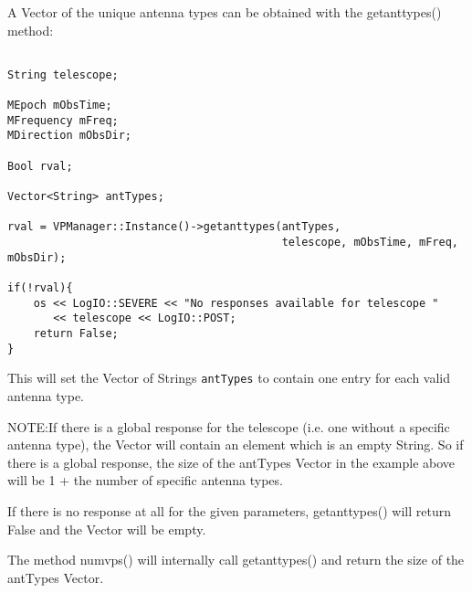\documentclass[12pt]{article}
\begin{document}
\newpage

A Vector of the unique antenna types can be obtained with the getanttypes() method:
{\small
\begin{verbatim}

String telescope; 

MEpoch mObsTime;
MFrequency mFreq;
MDirection mObsDir;

Bool rval;

Vector<String> antTypes;

rval = VPManager::Instance()->getanttypes(antTypes, 
                                          telescope, mObsTime, mFreq, mObsDir);

if(!rval){
    os << LogIO::SEVERE << "No responses available for telescope "
       << telescope << LogIO::POST;
    return False;
}

\end{verbatim}
}
This will set the Vector of Strings {\tt antTypes} to contain one entry
for each valid antenna type. 

NOTE:If there is a global response for the telescope (i.e. one without a specific antenna type),
the Vector will contain an element which is an empty String.
So if there is a global response, the size of the antTypes Vector in the example above 
will be 1 + the number of specific antenna types. 

If there is no response at all for the given parameters, getanttypes() will return False
and the Vector will be empty.

The method numvps() will internally call getanttypes() and return the size of the
antTypes Vector.
\end{document}

